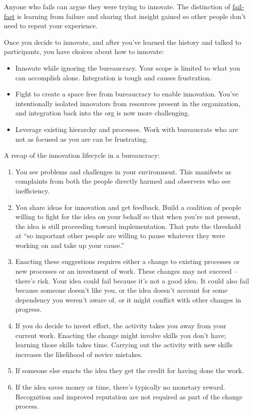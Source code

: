 Anyone who fails can argue they were trying to innovate. The distinction of \href{https://en.wikipedia.org/wiki/Fail-fast\%23Business}{fail-fast}\iftoggle{WPinmargin}{\marginpar{$>$Wikipedia: Fail-fast}}{}
 is learning from failure and sharing that insight gained so other people don't need to repeat your experience. 


Once you decide to innovate, and after you've learned the history and talked to participants, you have choices about how to innovate:
\begin{itemize}
\item Innovate while ignoring the bureaucracy. Your scope is limited to what you can accomplish alone. Integration is tough and causes frustration.
\item Fight to create a space free from bureaucracy to enable innovation. You've intentionally isolated innovators from resources present in the organization, and integration back into the org is now more challenging. 
\item Leverage existing hierarchy and processes. Work with bureaucrats who are not as focused as you are can be frustrating.
\end{itemize}


A recap of the innovation lifecycle in a bureaucracy:
\begin{enumerate}
    \item You see problems and challenges in your environment. This manifests as complaints from both the people directly harmed and observers who see inefficiency.
    \item You share ideas for innovation and get feedback. Build a coalition of people willing to fight for the idea on your behalf
    so that when you're not present, the idea is still proceeding toward implementation.  That puts the threshold at ``so important other people are willing to pause whatever they were working on and take up your cause.''
    \item Enacting these suggestions requires either a change to existing processes or new processes or an investment of work. These changes may not succeed -- there's risk. Your idea could fail because it's not a good idea. It could also fail because someone doesn't like you, or the idea doesn't account for some dependency you weren't aware of, or it might conflict with other changes in progress.
    \item If you do decide to invest effort, the activity takes you away from your current work. Enacting the change might involve skills you don't have; learning those skills takes time. Carrying out the activity with new skills increases the likelihood of novice mistakes.
    \item If someone else enacts the idea they get the credit for having done the work.
    \item If the idea saves money or time, there's typically no monetary reward. Recognition and improved reputation are not required as part of the change process. 
\end{enumerate}

